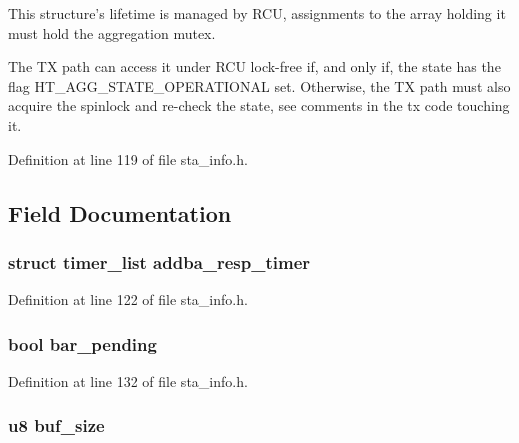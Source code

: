 This structure's lifetime is managed by R\-C\-U, assignments to the array holding it must hold the aggregation mutex.

The T\-X path can access it under R\-C\-U lock-\/free if, and only if, the state has the flag H\-T\-\_\-\-A\-G\-G\-\_\-\-S\-T\-A\-T\-E\-\_\-\-O\-P\-E\-R\-A\-T\-I\-O\-N\-A\-L set. Otherwise, the T\-X path must also acquire the spinlock and re-\/check the state, see comments in the tx code touching it. 

Definition at line 119 of file sta\-\_\-info.\-h.



\subsection{Field Documentation}
\hypertarget{structtid__ampdu__tx_a6da3a9ab680a571b267e51fcca5a3178}{
\subsubsection[{addba\-\_\-resp\-\_\-timer}]{\setlength{\rightskip}{0pt plus 5cm}struct timer\-\_\-list addba\-\_\-resp\-\_\-timer}}\label{structtid__ampdu__tx_a6da3a9ab680a571b267e51fcca5a3178}


Definition at line 122 of file sta\-\_\-info.\-h.

\hypertarget{structtid__ampdu__tx_a3d19fd08f014fe245dddaba7bc411ad0}{
\subsubsection[{bar\-\_\-pending}]{\setlength{\rightskip}{0pt plus 5cm}bool bar\-\_\-pending}}\label{structtid__ampdu__tx_a3d19fd08f014fe245dddaba7bc411ad0}


Definition at line 132 of file sta\-\_\-info.\-h.

\hypertarget{structtid__ampdu__tx_a9200bc5c3d0f32dca7213a89a0f76490}{
\subsubsection[{buf\-\_\-size}]{\setlength{\rightskip}{0pt plus 5cm}u8 buf\-\_\-size}}\label{structtid__ampdu__tx_a9200bc5c3d0f32dca7213a89a0f76490}


